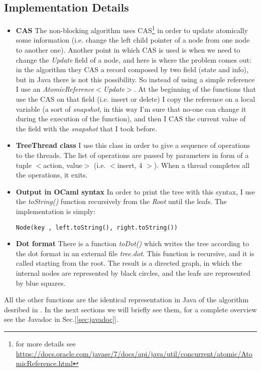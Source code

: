 \documentclass[a4paper]{article}
\begin{document}
\subsection{Implementation Details}
\label{subsec:implementation_details}
\begin{itemize}
  \item \textbf{\ac{CAS}} The non-blocking algorithm uses \ac{CAS}\footnote{for more details see \url{https://docs.oracle.com/javase/7/docs/api/java/util/concurrent/atomic/AtomicReference.html}} in order to update atomically some information (i.e. change the left child pointer of a node from one node to another one). Another point in which \ac{CAS} is used is when we need to change the \emph{Update} field of a node, and here is where the problem comes out: in the algorithm they \ac{CAS} a record composed by two field (state and info), but in Java there is not this possibility. So instead of using a simple reference I use an \emph{AtomicReference$<$Update$>$}. At the beginning of the functions that use the \ac{CAS} on that field (i.e. insert or delete) I copy the reference on a local variable (a sort of \emph{snapshot}, in this way I'm sure that no-one can change it during the execution of the function), and then I \ac{CAS} the current value of the field with the \emph{snapshot} that I took before.
  \item \textbf{TreeThread class} I use this class in order to give a sequence of operations to the threads. The list of operations are passed by parameters in form of a tuple $<$action, value$>$ (i.e. $<$insert, 4 $>$). When a thread completes all the operations, it exits.
  \item \textbf{Output in OCaml syntax} In order to print the tree with this syntax, I use the \emph{toString()} function recursively from the \emph{Root} until the leafs. The implementation is simply:

  \verb|Node(key , left.toString(), right.toString())|
  \item \textbf{Dot format} There is a function \emph{toDot()} which writes the tree according to the dot format in an external file \emph{tree.dot}. This function is recursive, and it is called starting from the root. The result is a directed graph, in which the internal nodes are represented by black circles, and the leafs are represented by blue squares.
\end{itemize}
\noindent
All the other functions are the identical representation in Java of the algorithm desribed in \cite{algorithm}. In the next sections we will briefly see them, for a complete overview see the Javadoc in Sec.[\ref{sec:javadoc}]. 
\end{document}
